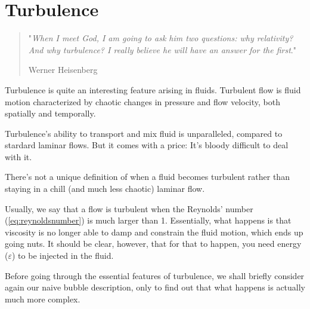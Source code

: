 \chapter{Turbulence}\label{ch:v}
\begin{quote}
   "\emph{When I meet God, I am going to ask him two questions: why relativity? And why turbulence? I really believe he will have an answer for the first}."
   \begin{flushright}
       \small Werner Heisenberg
   \end{flushright}
\end{quote}
Turbulence is quite an interesting feature arising in fluids. Turbulent flow is fluid motion characterized by chaotic changes in pressure and flow velocity, both spatially and temporally.
\par Turbulence's ability to transport and mix fluid is unparalleled, compared to stardard laminar flows. But it comes with a price: It's bloody difficult to deal with it.
\par There's not a unique definition of when a fluid becomes turbulent rather than staying in a chill (and much less chaotic) laminar flow.
\par Usually, we say that a flow is turbulent when the Reynolds' number (\ref{eq:reynoldsnumber}) is much larger than 1. Essentially, what happens is that viscosity is no longer able to damp and constrain the fluid motion, which ends up going nuts. It should be clear, however, that for that to happen, you need energy ($\varepsilon$) to be injected in the fluid.
\par Before going through the essential features of turbulence, we shall briefly consider again our naive bubble description, only to find out that what happens is actually much more complex.
